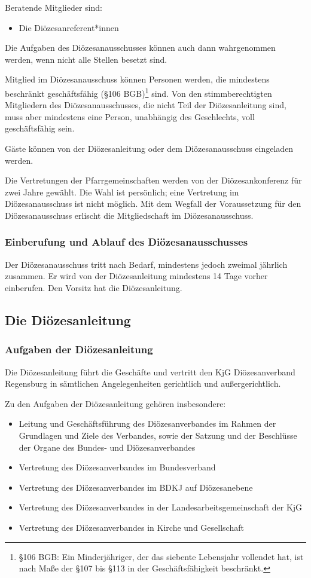 \documentclass[12pt]{report}
\begin{document}
\begin{justify}
Beratende Mitglieder sind:
\begin{itemize}
  \item Die Diözesanreferent*innen
\end{itemize}

Die Aufgaben des Diözesanausschusses können auch dann wahrgenommen werden, wenn nicht
alle Stellen besetzt sind.

Mitglied im Diözesanausschuss können Personen werden, die mindestens beschränkt geschäftsfähig (§106 BGB)\footnote{§106 BGB: Ein Minderjähriger, der das siebente Lebensjahr vollendet hat, ist nach Maße der §107 bis §113 in
der Geschäftsfähigkeit beschränkt.} sind.
Von den stimmberechtigten Mitgliedern des Diözesanausschusses, die nicht Teil der Diözesanleitung sind,
muss aber mindestens eine Person, unabhängig des Geschlechts, voll geschäftsfähig sein.

Gäste können von der Diözesanleitung oder dem Diözesanausschuss eingeladen werden.

Die Vertretungen der Pfarrgemeinschaften werden von der Diözesankonferenz für zwei Jahre
gewählt. Die Wahl ist persönlich; eine Vertretung im Diözesanausschuss ist nicht möglich. Mit
dem Wegfall der Voraussetzung für den Diözesanausschuss erlischt die Mitgliedschaft im Diözesanausschuss.

\subsubsection{Einberufung und Ablauf des Diözesanausschusses}
Der Diözesanausschuss tritt nach Bedarf, mindestens jedoch zweimal jährlich zusammen. Er wird
von der Diözesanleitung mindestens 14 Tage vorher einberufen. Den Vorsitz hat die Diözesanleitung.

\subsection{Die Diözesanleitung}

\subsubsection{Aufgaben der Diözesanleitung}
Die Diözesanleitung führt die Geschäfte und vertritt den KjG Diözesanverband Regensburg in sämtlichen
Angelegenheiten gerichtlich und außergerichtlich.

Zu den Aufgaben der Diözesanleitung gehören insbesondere:
\begin{itemize}
  \item Leitung und Geschäftsführung des Diözesanverbandes im Rahmen der Grundlagen und Ziele
        des Verbandes, sowie der Satzung und der Beschlüsse der Organe des Bundes- und Diözesanverbandes
  \item Vertretung des Diözesanverbandes im Bundesverband
  \item Vertretung des Diözesanverbandes im BDKJ auf Diözesanebene
  \item Vertretung des Diözesanverbandes in der Landesarbeitsgemeinschaft der KjG
  \item Vertretung des Diözesanverbandes in Kirche und Gesellschaft
\end{itemize}


\end{justify}
\end{document}

